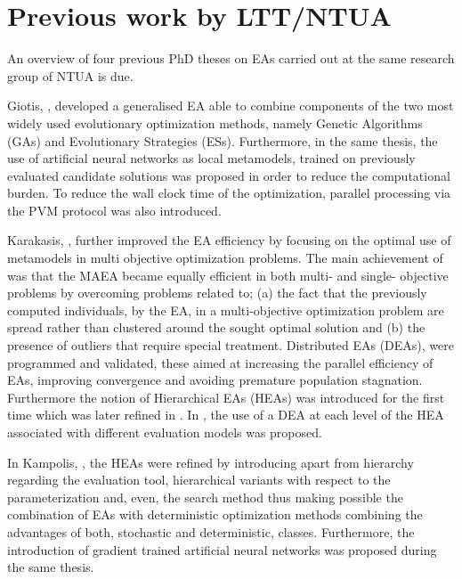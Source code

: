    

\section{Previous work by LTT/NTUA} %
\label{PRW}
An overview of four previous PhD theses on EAs carried out at the same research group of NTUA is due. 

Giotis, \cite{phd_Giotis}, developed a generalised EA able to combine components of the two most widely used evolutionary optimization methods, namely Genetic Algorithms (GAs) and Evolutionary Strategies (ESs). Furthermore, in the same thesis, the use of artificial neural networks as local metamodels, trained on previously evaluated candidate solutions was proposed in order to reduce the computational burden. To reduce the wall clock time of the optimization, parallel processing via the PVM protocol was also introduced. 

Karakasis, \cite{phd_Karakasis}, further improved the EA efficiency by focusing on the optimal use of metamodels in multi objective optimization problems. The main achievement of \cite{phd_Karakasis} was that the MAEA became equally efficient in both multi- and single- objective problems by overcoming problems related to; (a) the fact that the previously computed individuals, by the EA, in a multi-objective optimization problem are spread rather than clustered around the sought optimal solution and (b) the presence of outliers that require special treatment. Distributed EAs (DEAs), were programmed and validated, these aimed at increasing the parallel efficiency of EAs, improving convergence and avoiding premature population stagnation. Furthermore the notion of Hierarchical EAs (HEAs) was introduced for the first time which was later refined in \cite{phd_Kampolis}.    In \cite{phd_Karakasis}, the use of a DEA at each level of the HEA associated with different evaluation models was proposed.

In Kampolis, \cite{phd_Kampolis}, the HEAs were refined by introducing apart from hierarchy regarding the evaluation tool, hierarchical variants with respect to the parameterization and, even, the search method thus making possible the combination of EAs with deterministic optimization methods combining the advantages of both, stochastic and deterministic, classes. Furthermore, the introduction of gradient trained artificial neural networks was proposed during the same thesis.          

